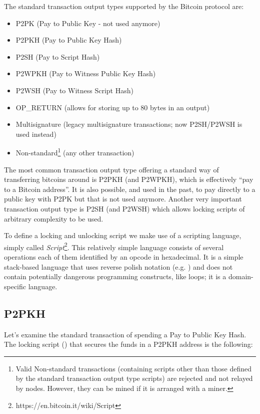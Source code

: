 The standard transaction output types supported by the Bitcoin protocol are:

\begin{itemize}
\item P2PK (Pay to Public Key - not used anymore)
\item P2PKH (Pay to Public Key Hash)
\item P2SH (Pay to Script Hash)
\item P2WPKH (Pay to Witness Public Key Hash)
\item P2WSH (Pay to Witness Script Hash)
\item OP\_RETURN (allows for storing up to 80 bytes in an output)
\item Multisignature (legacy multisignature transactions; now P2SH/P2WSH is used instead)
\item Non-standard\footnote{Valid Non-standard transactions (containing scripts other than those defined by the standard transaction output type scripts) are rejected and not relayed by nodes. However, they can be mined if it is arranged with a miner.} (any other transaction)
\end{itemize}

The most common transaction output type offering a standard way of transferring bitcoins around is P2PKH (and P2WPKH), which is effectively ``pay to a Bitcoin address''. It is also possible, and used in the past, to pay directly to a public key with P2PK but that is not used anymore. Another very important transaction output type is P2SH (and P2WSH) which allows locking scripts of arbitrary complexity to be used.

To define a locking and unlocking script we make use of a scripting language, simply called \emph{Script}\footnote{https://en.bitcoin.it/wiki/Script}. This relatively simple language consists of several operations each of them identified by an opcode in hexadecimal. It is a simple stack-based language that uses reverse polish notation (e.g. ) and does not contain potentially dangerous programming constructs, like loops; it is a domain-specific language.

\subsection*{P2PKH}

Let’s examine the standard transaction of spending a Pay to Public Key Hash. The locking script () that secures the funds in a P2PKH address is the following:

